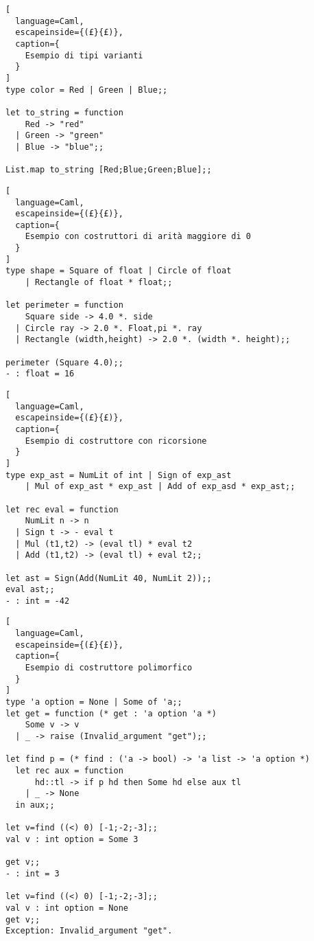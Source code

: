 \begin{lstlisting}[
  language=Caml,
  escapeinside={(£}{£)},
  caption={
    Esempio di tipi varianti
  }
]
type color = Red | Green | Blue;;

let to_string = function
    Red -> "red"
  | Green -> "green"
  | Blue -> "blue";;

List.map to_string [Red;Blue;Green;Blue];;
\end{lstlisting}

\begin{lstlisting}[
  language=Caml,
  escapeinside={(£}{£)},
  caption={
    Esempio con costruttori di arità maggiore di 0
  }
]
type shape = Square of float | Circle of float
    | Rectangle of float * float;;

let perimeter = function
    Square side -> 4.0 *. side
  | Circle ray -> 2.0 *. Float,pi *. ray
  | Rectangle (width,height) -> 2.0 *. (width *. height);;

perimeter (Square 4.0);;
- : float = 16
\end{lstlisting}

\begin{lstlisting}[
  language=Caml,
  escapeinside={(£}{£)},
  caption={
    Esempio di costruttore con ricorsione
  }
]
type exp_ast = NumLit of int | Sign of exp_ast
    | Mul of exp_ast * exp_ast | Add of exp_asd * exp_ast;;

let rec eval = function
    NumLit n -> n
  | Sign t -> - eval t
  | Mul (t1,t2) -> (eval tl) * eval t2
  | Add (t1,t2) -> (eval tl) + eval t2;;

let ast = Sign(Add(NumLit 40, NumLit 2));;
eval ast;;
- : int = -42
\end{lstlisting}

\begin{lstlisting}[
  language=Caml,
  escapeinside={(£}{£)},
  caption={
    Esempio di costruttore polimorfico
  }
]
type 'a option = None | Some of 'a;;
let get = function (* get : 'a option 'a *)
    Some v -> v
  | _ -> raise (Invalid_argument "get");;

let find p = (* find : ('a -> bool) -> 'a list -> 'a option *)
  let rec aux = function
      hd::tl -> if p hd then Some hd else aux tl
    | _ -> None
  in aux;;

let v=find ((<) 0) [-1;-2;-3];;
val v : int option = Some 3

get v;;
- : int = 3

let v=find ((<) 0) [-1;-2;-3];;
val v : int option = None
get v;;
Exception: Invalid_argument "get".
\end{lstlisting}

